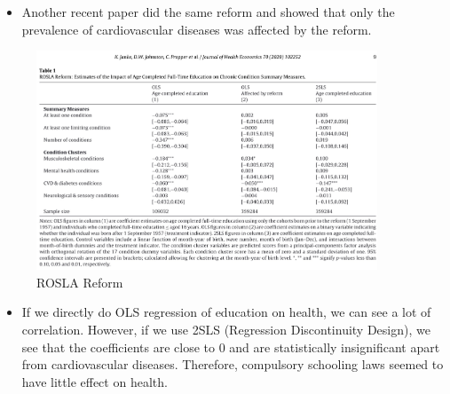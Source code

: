 \begin{itemize}
        \item Another recent paper did the same reform and showed that only the prevalence of cardiovascular diseases was affected by the reform.
\end{itemize}

     \begin{figure}[H]%
                \centering
                \includegraphics[width=4in]{images/ch3/40.png}
                \caption{ROSLA Reform}
                \label{fig:label}
            \end{figure}        
            
\begin{itemize}
        \item If we directly do OLS regression of education on health, we can see a lot of correlation. However, if we use 2SLS (Regression Discontinuity Design), we see that the coefficients are close to 0 and are statistically insignificant apart from cardiovascular diseases. Therefore, compulsory schooling laws seemed to have little effect on health.
\end{itemize}
        
